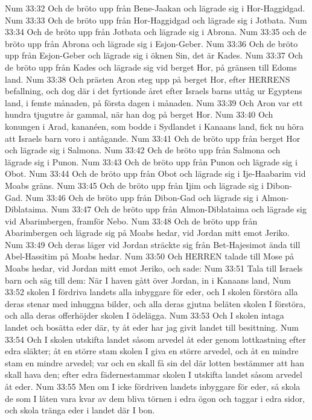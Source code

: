Num 33:32  Och de bröto upp från Bene-Jaakan och lägrade sig i Hor-Haggidgad.
Num 33:33  Och de bröto upp från Hor-Haggidgad och lägrade sig i Jotbata.
Num 33:34  Och de bröto upp från Jotbata och lägrade sig i Abrona.
Num 33:35  och de bröto upp från Abrona och lägrade sig i Esjon-Geber.
Num 33:36  Och de bröto upp från Esjon-Geber och lägrade sig i öknen Sin, det är Kades.
Num 33:37  Och de bröto upp från Kades och lägrade sig vid berget Hor, på gränsen till Edoms land.
Num 33:38  Och prästen Aron steg upp på berget Hor, efter HERRENS befallning, och dog där i det fyrtionde året efter Israels barns uttåg ur Egyptens land, i femte månaden, på första dagen i månaden.
Num 33:39  Och Aron var ett hundra tjugutre år gammal, när han dog på berget Hor.
Num 33:40  Och konungen i Arad, kananéen, som bodde i Sydlandet i Kanaans land, fick nu höra att Israels barn voro i antågande.
Num 33:41  Och de bröto upp från berget Hor och lägrade sig i Salmona.
Num 33:42  Och de bröto upp från Salmona och lägrade sig i Punon.
Num 33:43  Och de bröto upp från Punon och lägrade sig i Obot.
Num 33:44  Och de bröto upp från Obot och lägrade sig i Ije-Haabarim vid Moabs gräns.
Num 33:45  Och de bröto upp från Ijim och lägrade sig i Dibon-Gad.
Num 33:46  Och de bröto upp från Dibon-Gad och lägrade sig i Almon-Diblataima.
Num 33:47  Och de bröto upp från Almon-Diblataima och lägrade sig vid Abarimbergen, framför Nebo.
Num 33:48  Och de bröto upp från Abarimbergen och lägrade sig på Moabs hedar, vid Jordan mitt emot Jeriko.
Num 33:49  Och deras läger vid Jordan sträckte sig från Bet-Hajesimot ända till Abel-Hassitim på Moabs hedar.
Num 33:50  Och HERREN talade till Mose på Moabs hedar, vid Jordan mitt emot Jeriko, och sade:
Num 33:51  Tala till Israels barn och säg till dem: När I haven gått över Jordan, in i Kanaans land,
Num 33:52  skolen I fördriva landets alla inbyggare för eder, och I skolen förstöra alla deras stenar med inhuggna bilder, och alla deras gjutna beläten skolen I förstöra, och alla deras offerhöjder skolen I ödelägga.
Num 33:53  Och I skolen intaga landet och bosätta eder där, ty åt eder har jag givit landet till besittning.
Num 33:54  Och I skolen utskifta landet såsom arvedel åt eder genom lottkastning efter edra släkter; åt en större stam skolen I giva en större arvedel, och åt en mindre stam en mindre arvedel; var och en skall få sin del där lotten bestämmer att han skall hava den; efter edra fädernestammar skolen I utskifta landet såsom arvedel åt eder.
Num 33:55  Men om I icke fördriven landets inbyggare för eder, så skola de som I låten vara kvar av dem bliva törnen i edra ögon och taggar i edra sidor, och skola tränga eder i landet där I bon.
